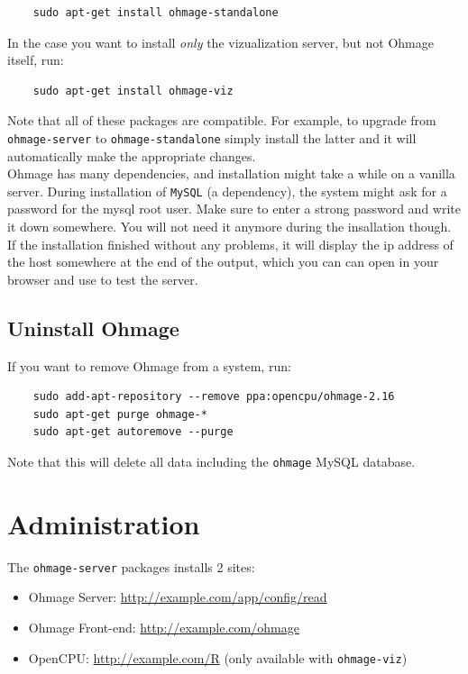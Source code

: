 \documentclass{scrartcl}
\begin{document}
\begin{verbatim}
    sudo apt-get install ohmage-standalone
\end{verbatim}
In the case you want to install \emph{only} the vizualization server, but not
Ohmage itself, run:
\begin{verbatim}
    sudo apt-get install ohmage-viz
\end{verbatim}
Note that all of these packages are compatible. For example, to upgrade from
\texttt{ohmage-server} to \texttt{ohmage-standalone} simply install the
latter and it will automatically make the appropriate changes. \\

\noindent Ohmage has many dependencies, and installation might take a while on
a vanilla server. During installation of \texttt{MySQL} (a dependency), the
system might ask for a password for the mysql root user. Make sure to enter a strong
password and write it down somewhere. You will not need it anymore during the
insallation though.\\

\noindent If the installation finished without any problems, it will display the
ip address of the host somewhere at the end of the output, which you can can
open in your browser and use to test the server. 

\subsection{Uninstall Ohmage}

If you want to remove Ohmage from a system, run:

\begin{verbatim}
    sudo add-apt-repository --remove ppa:opencpu/ohmage-2.16
    sudo apt-get purge ohmage-*
    sudo apt-get autoremove --purge
\end{verbatim}
Note that this will delete all data including the \texttt{ohmage} MySQL
database.

\section{Administration}

The \texttt{ohmage-server} packages installs 2 sites:

\begin{itemize}
  \item Ohmage Server: \url{http://example.com/app/config/read}
  \item Ohmage Front-end: \url{http://example.com/ohmage}
  \item OpenCPU: \url{http://example.com/R} (only available with
  \texttt{ohmage-viz})
\end{itemize}
\end{document}
